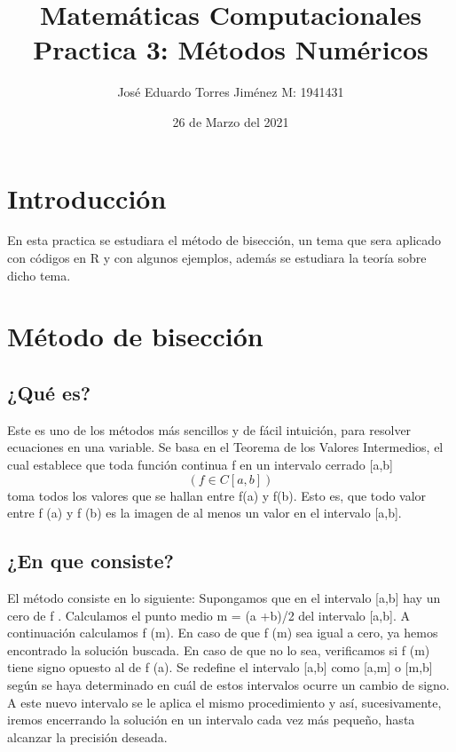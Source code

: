 \documentclass{article}
\title{Matemáticas Computacionales \\ Practica 3: Métodos Numéricos}
\author{José Eduardo Torres Jiménez     M: 1941431}
\date{26 de Marzo del 2021}
\begin{document}
\maketitle

\section{Introducción}
En esta practica se estudiara el método de bisección, un tema que sera aplicado con códigos en R y con algunos ejemplos, además se estudiara la teoría sobre dicho tema.

\section{Método de bisección}
\subsection{¿Qué es?}
Este es uno de los métodos más sencillos y de fácil
intuición, para resolver ecuaciones en una variable. Se
basa en el Teorema de los Valores Intermedios, el cual
establece que toda función continua f en un intervalo
cerrado [a,b] 
\begin{equation}
    ( f \in C[a,b] )
\end{equation}
toma todos los valores que
se hallan entre f(a) y f(b). Esto es, que todo valor entre
f (a) y f (b) es la imagen de al menos un valor en el
intervalo [a,b].

\subsection{¿En que consiste?}
El método consiste en lo siguiente: Supongamos que en el intervalo [a,b] hay un cero de f . Calculamos el punto
medio m = (a +b)/2 del intervalo [a,b]. A continuación calculamos f (m). En caso de que f (m) sea igual a cero,
ya hemos encontrado la solución buscada. En caso de que no lo sea, verificamos si f (m) tiene signo opuesto al
de f (a). Se redefine el intervalo [a,b] como [a,m] o [m,b] según se haya determinado en cuál de estos intervalos
ocurre un cambio de signo. A este nuevo intervalo se le aplica el mismo procedimiento y así, sucesivamente, iremos
encerrando la solución en un intervalo cada vez más pequeño, hasta alcanzar la precisión deseada.
\end{document}
